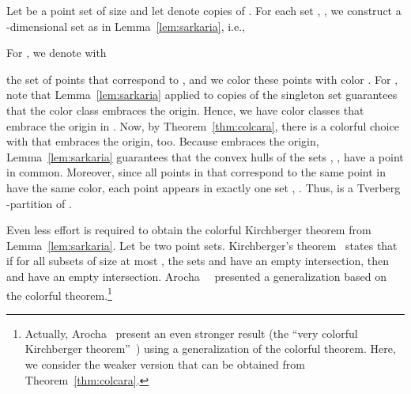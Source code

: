 \begin{prf}\label{thm:tverberg:proof}
Let  be a point set of size
 and let  denote  copies of .
For each set , , we construct a -dimensional set  as in Lemma~\ref{lem:sarkaria}, i.e.,

For , we denote with 

the set of points  that 
correspond to ,
and we color these points with color . For , note that
Lemma~\ref{lem:sarkaria} applied to  copies of the singleton set 
 guarantees that the color class  embraces the origin. Hence, we have  color classes
 that embrace the origin in . Now,
by Theorem~\ref{thm:colcara}, there is a
colorful choice  with  that embraces the
origin, too. Because  embraces the origin,
Lemma~\ref{lem:sarkaria} guarantees that the convex hulls of the sets 
, , 
have a point in common.
Moreover, since all points in 
that correspond to the same point in  have the same
color, each point  appears in exactly one set 
, .
Thus,  is a Tverberg -partition of .
\end{prf}

Even less effort is required to obtain the colorful Kirchberger theorem 
from Lemma~\ref{lem:sarkaria}. Let  be two point sets.
Kirchberger's theorem~\cite{Kirchberger1903} states that if for all 
subsets  of size at most ,
the sets  and  have an empty 
intersection, then  and  have an empty intersection.
Arocha~\etal~\cite{ArochaBaBrFaMo2009} presented a generalization based 
on the colorful \Caratheodory theorem.\footnote{Actually, Arocha~\etal 
present an even stronger result (the ``very colorful Kirchberger
theorem''~\cite[Theorem~3]{ArochaBaBrFaMo2009}) using a generalization 
of the colorful \Caratheodory theorem. Here, we consider the weaker 
version that can be obtained from Theorem~\ref{thm:colcara}.}

